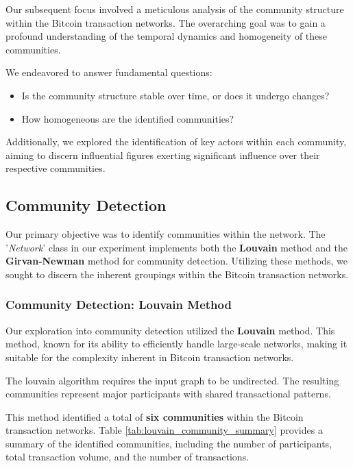 \documentclass[a4paper, 12pt]{article}
\begin{document}
Our subsequent focus involved a meticulous analysis of the community structure within the Bitcoin transaction networks. The overarching goal was to gain a profound understanding of the temporal dynamics and homogeneity of these communities.

We endeavored to answer fundamental questions:
\begin{itemize}
    \item Is the community structure stable over time, or does it undergo changes?
    \item How homogeneous are the identified communities? \\
\end{itemize}

Additionally, we explored the identification of key actors within each community, aiming to discern influential figures exerting significant influence over their respective communities.

\subsection{Community Detection}

Our primary objective was to identify communities within the network. The '\textit{Network}' class in our experiment implements both the \textbf{Louvain} method and the \textbf{Girvan-Newman} method for community detection. Utilizing these methods, we sought to discern the inherent groupings within the Bitcoin transaction networks. 

\subsubsection{Community Detection: Louvain Method}

Our exploration into community detection utilized the \textbf{Louvain} method. This method, known for its ability to efficiently handle large-scale networks, making it suitable for the complexity inherent in Bitcoin transaction networks.

The louvain algorithm requires the input graph to be undirected. The resulting communities represent major participants with shared transactional patterns.

This method identified a total of \textbf{six communities} within the Bitcoin transaction networks. Table \ref{tab:louvain_community_summary} provides a summary of the identified communities, including the number of participants, total transaction volume, and the number of transactions.
\end{document}
